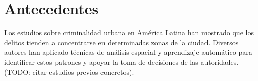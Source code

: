 
\section{Antecedentes}

\label{sec:antecedentes}

Los estudios sobre criminalidad urbana en América Latina han mostrado
que los delitos tienden a concentrarse en determinadas zonas de la
ciudad. Diversos autores han aplicado técnicas de análisis espacial
y aprendizaje automático para identificar estos patrones y apoyar
la toma de decisiones de las autoridades. (TODO: citar estudios previos
concretos).
